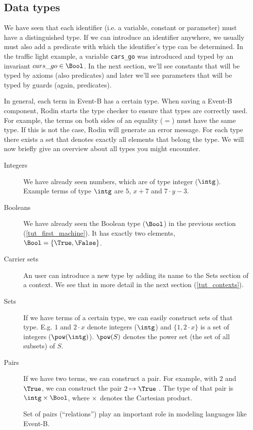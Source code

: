 \subsection{Data types}
\label{tut_data_types}
We have seen that each identifier (i.e. a variable, constant or parameter) must have a distinguished type.
If we can introduce an identifier anywhere, we usually must also add a predicate with which the
identifier's type can be determined. In the traffic light example, a variable \texttt{cars\_go} was
introduced and typed by an invariant $cars\_go \in \Bool$. In the next section, we'll see constants that
will be typed by axioms (also predicates) and later we'll see parameters that will be typed by guards (again, predicates).

In general, each term in Event-B has a certain type. 
When saving a Event-B component, Rodin starts the type checker to ensure that types are correctly used. For example, the terms on both sides of an equality ($=$) must have the same type. If this is not the case, Rodin will generate an error message.
For each type there exists a set that denotes exactly all elements that belong the type. We will now briefly
give an overview about all types you might encounter.

\begin{description}
\item[Integers] 
  We have already seen numbers, which are of type integer ($\intg$).
  Example terms of type $\intg$ are $5$, $x+7$ and $7 \cdot y - 3$.
\item[Booleans]
  We have already seen the Boolean type ($\Bool$) in the previous section (\ref{tut_first_machine}).
  It has exactly two elements, $\Bool = \{\True,\False\}$.
\item[Carrier sets]
  An user can introduce a new type by adding its name to the
  \textsf{Sets} section of a context. We see that in more detail in the next section (\ref{tut_contexts}).
\item[Sets]
  If we have terms of a certain type, we can easily construct sets of that type.
  E.g. $1$ and $2\cdot x$ denote integers ($\intg$) and $\{1,2\cdot x\}$ is a set of integers ($\pow(\intg)$).
  $\pow(S)$  denotes the power set (the set of all subsets) of $S$.
\item[Pairs]
  If we have two terms, we can construct a pair. For example, with $2$ and $\True$, we
  can construct the pair $2\mapsto\True$ .
  The type of that pair is $\intg\cprod\Bool$, where $\mathbin\times$ denotes the Cartesian product.

  Set of pairs (``relations'') play an important role in modeling languages like Event-B.
\end{description}

